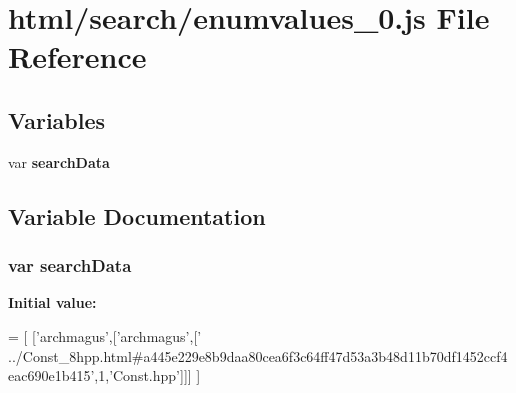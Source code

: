 \section{html/search/enumvalues\-\_\-0.js File Reference}
\label{enumvalues__0_8js}
\subsection*{Variables}
\begin{DoxyCompactItemize}
\item 
var {\bf search\-Data}
\end{DoxyCompactItemize}


\subsection{Variable Documentation}
\subsubsection[{search\-Data}]{\setlength{\rightskip}{0pt plus 5cm}var search\-Data}\label{enumvalues__0_8js_ad01a7523f103d6242ef9b0451861231e}
{\bfseries Initial value\-:}
\begin{DoxyCode}
=
[
  [\textcolor{stringliteral}{'archmagus'},[\textcolor{stringliteral}{'archmagus'},[\textcolor{stringliteral}{'
      ../Const\_8hpp.html#a445e229e8b9daa80cea6f3c64ff47d53a3b48d11b70df1452ccf4eac690e1b415'},1,\textcolor{stringliteral}{'Const.hpp'}]]]
]
\end{DoxyCode}
